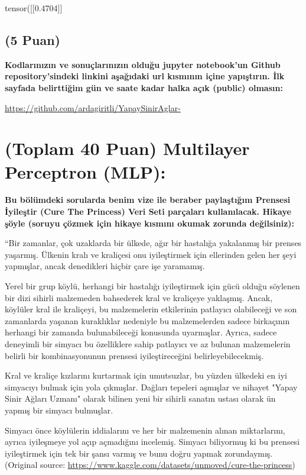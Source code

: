\documentclass[11pt]{article}
\begin{document}
tensor([[0.4704]]

\subsection{(5 Puan)} \textbf{Kodlarınızın ve sonuçlarınızın olduğu jupyter notebook'un Github repository'sindeki linkini aşağıdaki url kısmının içine yapıştırın. İlk sayfada belirttiğim gün ve saate kadar halka açık (public) olmasın:}

\url{https://github.com/ardagiritli/YapaySinirAglar-}

\section{(Toplam 40 Puan) Multilayer Perceptron (MLP):} 
\textbf{Bu bölümdeki sorularda benim vize ile beraber paylaştığım Prensesi İyileştir (Cure The Princess) Veri Seti parçaları kullanılacak. Hikaye şöyle (soruyu çözmek için hikaye kısmını okumak zorunda değilsiniz):} 

``Bir zamanlar, çok uzaklarda bir ülkede, ağır bir hastalığa yakalanmış bir prenses yaşarmış. Ülkenin kralı ve kraliçesi onu iyileştirmek için ellerinden gelen her şeyi yapmışlar, ancak denedikleri hiçbir çare işe yaramamış.

Yerel bir grup köylü, herhangi bir hastalığı iyileştirmek için gücü olduğu söylenen bir dizi sihirli malzemeden bahsederek kral ve kraliçeye yaklaşmış. Ancak, köylüler kral ile kraliçeyi, bu malzemelerin etkilerinin patlayıcı olabileceği ve son zamanlarda yaşanan kuraklıklar nedeniyle bu malzemelerden sadece birkaçının herhangi bir zamanda bulunabileceği konusunda uyarmışlar. Ayrıca, sadece deneyimli bir simyacı bu özelliklere sahip patlayıcı ve az bulunan malzemelerin belirli bir kombinasyonunun prensesi iyileştireceğini belirleyebilecekmiş.

Kral ve kraliçe kızlarını kurtarmak için umutsuzlar, bu yüzden ülkedeki en iyi simyacıyı bulmak için yola çıkmışlar. Dağları tepeleri aşmışlar ve nihayet "Yapay Sinir Ağları Uzmanı" olarak bilinen yeni bir sihirli sanatın ustası olarak ün yapmış bir simyacı bulmuşlar.

Simyacı önce köylülerin iddialarını ve her bir malzemenin alınan miktarlarını, ayrıca iyileşmeye yol açıp açmadığını incelemiş. Simyacı biliyormuş ki bu prensesi iyileştirmek için tek bir şansı varmış ve bunu doğru yapmak zorundaymış. (Original source: \url{https://www.kaggle.com/datasets/unmoved/cure-the-princess})
\end{document}
